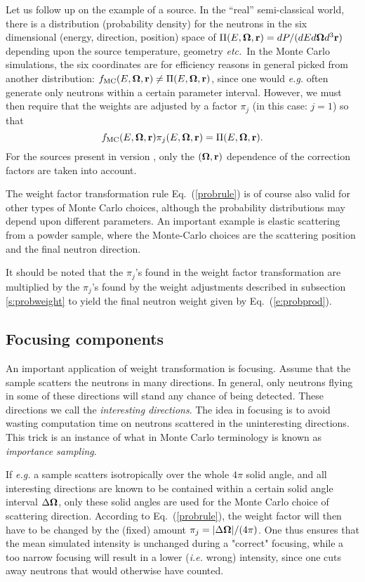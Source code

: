 Let us follow up on the example of a source.
In the ``real'' semi-classical world, there is a distribution
(probability density) for the neutrons in the six dimensional
(energy, direction, position) space of
$\Pi(E,\mbox{\boldmath $\Omega$},{\bf r}) = dP/(dE d\mbox{\boldmath $\Omega$} d^3{\bf r})$ depending upon
the source temperature, geometry {\em etc.}\ In the
Monte Carlo simulations, the six coordinates are for efficiency reasons
in general picked from another distribution:
$f_{\rm MC}(E,\mbox{\boldmath $\Omega$},{\bf r}) \neq \Pi(E, \mbox{\boldmath $\Omega$},{\bf r})$,
since one would {\em e.g.} often generate
only neutrons within a certain parameter interval.
However, we must then require that the weights are adjusted
by a factor $\pi_j$ (in this case: $j=1$) so that
\begin{equation} \label{probrule}
f_{\rm MC}(E,\mbox{\boldmath $\Omega$},{\bf r}) \pi_j(E,\mbox{\boldmath $\Omega$},{\bf r})
 = \Pi(E,\mbox{\boldmath $\Omega$},{\bf r}) .
\end{equation}
For the sources present in version \version, 
only the $(\mbox{\boldmath $\Omega$}, {\bf r})$ dependence of the correction factors
are taken into account.

The weight factor transformation rule Eq.~(\ref{probrule})
is of course also valid for other types of Monte Carlo choices,
although the probability distributions may depend upon 
different parameters. An important example 
is elastic scattering from a powder sample,
where the Monte-Carlo choices are the scattering position
and the final neutron direction.

It should be noted that the $\pi_j$'s found in the weight factor 
transformation are multiplied by the $\pi_j$'s found by the
weight adjustments described in
subsection \ref{s:probweight} to yield the final neutron
weight given by Eq.~(\ref{e:probprod}).

\subsection{Focusing components}
\label{s:focus}
An important application of weight transformation is focusing.
Assume that the sample scatters the neutrons in many directions.
In general, only neutrons flying in some of these directions will
stand any chance of being detected. These directions we call
the {\em interesting directions}.
The idea in focusing is to avoid wasting computation time on
neutrons scattered in the uninteresting directions. 
This trick is an instance of what in Monte Carlo terminology
is known as {\em importance sampling}. %

If {\em e.g.} a sample scatters isotropically 
over the whole $4\pi$ solid angle, and all interesting
directions are known to be contained within a certain 
solid angle interval $\Delta \mbox{\boldmath $\Omega$}$, only these solid angles 
are used for the Monte Carlo choice of scattering direction. 
According to Eq.~(\ref{probrule}), the weight factor will then have
to be changed by the (fixed) amount 
$\pi_j = |\Delta \mbox{\boldmath $\Omega$}| / (4 \pi)$.
One thus ensures that the mean simulated intensity is unchanged
during a "correct" focusing, while a too narrow focusing will
result in a lower (\textit{i.e.} wrong) intensity, since one cuts
away neutrons that would otherwise have counted.

